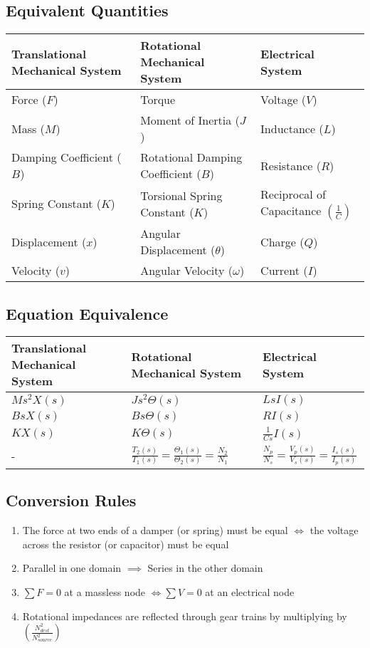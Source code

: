 \subsection*{Equivalent Quantities}
\begin{center}
  \begin{tabularx}{\textwidth}{XXX}
    \hline
    Translational Mechanical System & Rotational Mechanical System & Electrical System \\
    \hline
    Force ($F$) & Torque & Voltage ($V$)\\
    Mass ($M$) & Moment of Inertia ($J$) & Inductance ($L$)\\
    Damping Coefficient ($B$) & Rotational Damping Coefficient ($B$) & Resistance ($R$)\\
    Spring Constant ($K$) & Torsional Spring Constant ($K$) & Reciprocal of Capacitance $\left( \frac{1}{C} \right)$\\
    Displacement ($x$) & Angular Displacement ($\theta$) & Charge ($Q$)\\
    Velocity ($v$) & Angular Velocity ($\omega$) & Current ($I$)
  \end{tabularx}
\end{center}
\subsection*{Equation Equivalence}
\begin{center}
  \begin{tabularx}{\textwidth}{XXX}
    \hline
    Translational Mechanical System & Rotational Mechanical System & Electrical System \\
    \hline
    $Ms^2X(s)$ & $Js^2\Theta(s)$ & $LsI(s)$\\
    $BsX(s)$ & $Bs\Theta(s)$ & $RI(s)$\\
    $KX(s)$ & $K\Theta(s)$ & $\frac{1}{Cs}I(s)$\\
    - & $\frac{T_2(s)}{T_1(s)}=\frac{\Theta_1(s)}{\Theta_2(s)}=\frac{N_2}{N_1}$ & $\frac{N_p}{N_s}=\frac{V_p(s)}{V_s(s)}=\frac{I_s(s)}{I_p(s)}$\\
  \end{tabularx}
\end{center}
\subsection*{Conversion Rules}
\begin{enumerate}
  \item The force at two ends of a damper (or spring) must be equal $\Leftrightarrow$ the voltage across the resistor (or capacitor) must be equal
  \item Parallel in one domain $\implies$ Series in the other domain
  \item $\sum F = 0$ at a massless node $\Leftrightarrow \sum V = 0$ at an electrical node
  \item Rotational impedances are reflected through gear trains by multiplying by $\left( \frac{N^2_{dest}}{N^2_{source}} \right)$
\end{enumerate}
